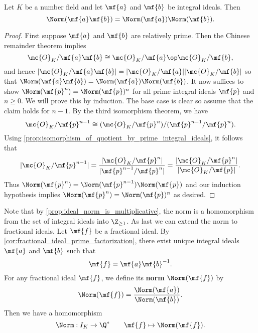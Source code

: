     \begin{proposition}\label{prop:ideal_norm_is_multiplicative}
      Let $K$ be a number field and let $\mf{a}$ and $\mf{b}$ be integral ideals. Then
      \[
        \Norm(\mf{a}\mf{b}) = \Norm(\mf{a})\Norm(\mf{b}).
      \]
    \end{proposition}
    \begin{proof}
      First suppose $\mf{a}$ and $\mf{b}$ are relatively prime. Then the Chinese remainder theorem implies
      \[
        \mc{O}_{K}/\mf{a}\mf{b} \cong \mc{O}_{K}/\mf{a} \op \mc{O}_{K}/\mf{b},
      \]
      and hence $|\mc{O}_{K}/\mf{a}\mf{b}| = |\mc{O}_{K}/\mf{a}||\mc{O}_{K}/\mf{b}|$ so that $\Norm(\mf{a}\mf{b}) = \Norm(\mf{a})\Norm(\mf{b})$. It now suffices to show $\Norm(\mf{p}^{n}) = \Norm(\mf{p})^{n}$ for all prime integral ideals $\mf{p}$ and $n \ge 0$. We will prove this by induction. The base case is clear so assume that the claim holds for $n-1$. By the third isomorphism theorem, we have
      \[
        \mc{O}_{K}/\mf{p}^{n-1} \cong (\mc{O}_{K}/\mf{p}^{n})/(\mf{p}^{n-1}/\mf{p}^{n}).
      \]
      Using \cref{prop:isomorphism_of_quotient_by_prime_integral_ideals}, it follows that
      \[
        |\mc{O}_{K}/\mf{p}^{n-1}| = \frac{|\mc{O}_{K}/\mf{p}^{n}|}{|\mf{p}^{n-1}/\mf{p}^{n}|} = \frac{|\mc{O}_{K}/\mf{p}^{n}|}{|\mc{O}_{K}/\mf{p}|}.
      \]
      Thus $\Norm(\mf{p}^{n}) = \Norm(\mf{p}^{n-1})\Norm(\mf{p})$ and our induction hypothesis implies $\Norm(\mf{p}^{n}) = \Norm(\mf{p})^{n}$ as desired.
    \end{proof}

    Note that by \cref{prop:ideal_norm_is_multiplicative}, the norm is a homomorphism from the set of integral ideals into $\Z_{\ge 1}$. As last we can extend the norm to fractional ideals. Let $\mf{f}$ be a fractional ideal. By \cref{cor:fractional_ideal_prime_factorization}, there exist unique integral ideals $\mf{a}$ and $\mf{b}$ such that
    \[
      \mf{f} = \mf{a}\mf{b}^{-1}.
    \]
    For any fractional ideal $\mf{f}$, we define its \textbf{norm} $\Norm(\mf{f})$ by
    \[
      \Norm(\mf{f}) = \frac{\Norm(\mf{a})}{\Norm(\mf{b})}.
    \]
    Then we have a homomorphism
    \[
      \Norm:I_{K} \to \Q^{\ast} \qquad \mf{f} \mapsto \Norm(\mf{f}).
    \]

